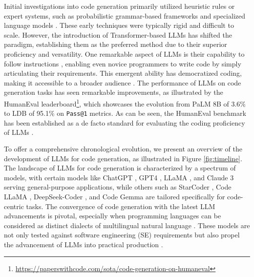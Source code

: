 Initial investigations into code generation primarily utilized heuristic rules or expert systems, such as probabilistic grammar-based frameworks \cite{joshi2003formalism,cohn2010inducing,allamanis2014mining,xiong2017precise,ji2020question} and specialized language models \cite{de2008z3,gulwani2010dimensions,jha2010oracle}. 
These early techniques were typically rigid and difficult to scale. 
However, the introduction of Transformer-based LLMs has shifted the paradigm, establishing them as the preferred method due to their superior proficiency and versatility.
One remarkable aspect of LLMs is their capability to follow instructions \cite{wei2022emergent,ouyang2022training,xu2023wizardlm,muennighoff2023octopack,chung2024scaling}, enabling even novice programmers to write code by simply articulating their requirements. This emergent ability has democratized coding, making it accessible to a broader audience \cite{zan2023large}. 
The performance of LLMs on code generation tasks has seen remarkable improvements, as illustrated by the HumanEval leaderboard\footnote{\href{https://paperswithcode.com/sota/code-generation-on-humaneval}{https://paperswithcode.com/sota/code-generation-on-humaneval}}, which showcases the evolution from PaLM 8B \cite{chowdhery2023palm} of 3.6\% to LDB \cite{zhong2024ldb} of 95.1\% on \texttt{Pass@1} metrics. 
As can be seen, the HumanEval benchmark \cite{chen2021evaluating} has been established as a de facto standard for evaluating the coding proficiency of LLMs \cite{chen2021evaluating}.
 
To offer a comprehensive chronological evolution, we present an overview of the development of LLMs for code generation, as illustrated in Figure \ref{fig:timeline}. 
The landscape of LLMs for code generation is characterized by a spectrum of models, with certain models like ChatGPT \cite{ouyang2022training}, GPT4 \cite{achiam2023gpt}, LLaMA \cite{touvron2023llama,touvron2023llama2}, and Claude 3 \cite{claude3} serving general-purpose applications, while others such as StarCoder \cite{li2023starcoder,lozhkov2024starcoder}, Code LLaMA \cite{roziere2023code}, DeepSeek-Coder \cite{guo2024deepseek}, and Code Gemma \cite{codegemma_2024} are tailored specifically for code-centric tasks.
The convergence of code generation with the latest LLM advancements is pivotal, especially when programming languages can be considered as distinct dialects of multilingual natural language \cite{athiwaratkun2022multi,zheng2023codegeex}. 
These models are not only tested against software engineering (SE) requirements but also propel the advancement of LLMs into practical production \cite{zhang2023unifying}.

